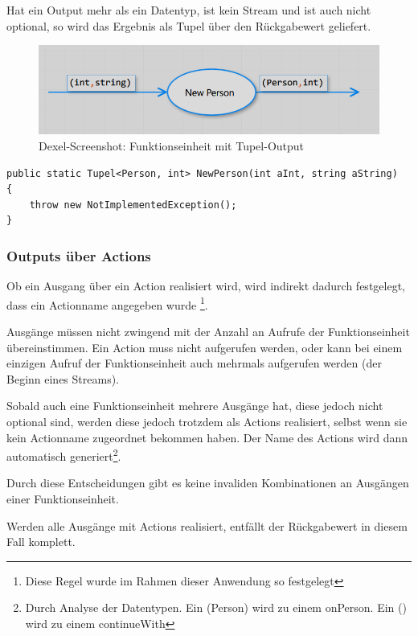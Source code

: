 	Hat ein Output mehr als ein Datentyp, ist kein Stream und ist auch nicht optional, so
	wird das Ergebnis als Tupel über den Rückgabewert geliefert.
	
		\begin{figure}[H]
			\centering
			\includegraphics[width=.8\linewidth]{./img/roslyn_twoDatatypesOneOutput.png} 
			\caption{Dexel-Screenshot: Funktionseinheit mit Tupel-Output}
		\end{figure}

	
	
	\begin{lstlisting}[caption=Mit Dexel generierter Code ]
public static Tupel<Person, int> NewPerson(int aInt, string aString)
{
	throw new NotImplementedException();
}
	\end{lstlisting}

	
\subsubsection{Outputs über Actions}

	Ob ein Ausgang über ein Action realisiert wird, wird indirekt dadurch
	festgelegt, dass ein Actionname angegeben wurde \footnote{Diese Regel wurde im
		Rahmen dieser Anwendung so festgelegt}. 
	
	Ausgänge müssen nicht zwingend mit
	der Anzahl an Aufrufe der Funktionseinheit übereinstimmen. Ein Action muss
	nicht aufgerufen werden, oder kann bei einem einzigen Aufruf der Funktionseinheit auch
	mehrmals aufgerufen werden (der Beginn eines Streams). 
	
	Sobald auch eine Funktionseinheit mehrere Ausgänge hat, diese jedoch nicht
	optional sind, werden diese jedoch trotzdem als Actions realisiert, selbst wenn sie kein
	Actionname zugeordnet bekommen haben. Der Name des Actions wird dann
	automatisch generiert\footnote{	Durch Analyse der Datentypen. Ein
	(Person) wird zu einem onPerson. Ein () wird zu einem continueWith}.
	
	Durch diese Entscheidungen gibt es keine invaliden Kombinationen an
	Ausgängen einer Funktionseinheit.
	
	
	Werden alle Ausgänge mit Actions realisiert, entfällt der Rückgabewert in diesem Fall komplett.
	
